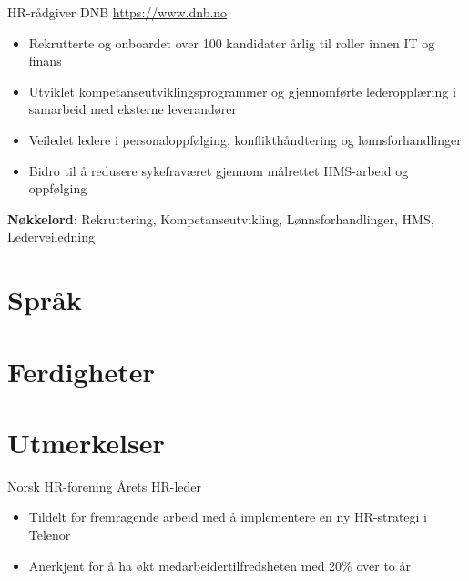 \documentclass[a4paper, serif, 10pt]{moderncv}
\begin{document}
        {HR-rådgiver}
        {DNB}
        {\url{https://www.dnb.no}}
        {}
        {\begin{itemize}
\item Rekrutterte og onboardet over 100 kandidater årlig til roller innen IT og finans
\item Utviklet kompetanseutviklingsprogrammer og gjennomførte lederopplæring i samarbeid med eksterne leverandører
\item Veiledet ledere i personaloppfølging, konflikthåndtering og lønnsforhandlinger
\item Bidro til å redusere sykefraværet gjennom målrettet HMS-arbeid og oppfølging
\end{itemize}
\textbf{Nøkkelord}: Rekruttering, Kompetanseutvikling, Lønnsforhandlinger, HMS, Lederveiledning}
\section{Språk}

\section{Ferdigheter}

\section{Utmerkelser}

        {Norsk HR-forening}
        {Årets HR-leder}
        {}
        {}
        {\begin{itemize}
\item Tildelt for fremragende arbeid med å implementere en ny HR-strategi i Telenor
\item Anerkjent for å ha økt medarbeidertilfredsheten med 20\% over to år
\end{itemize}}
\end{document}

